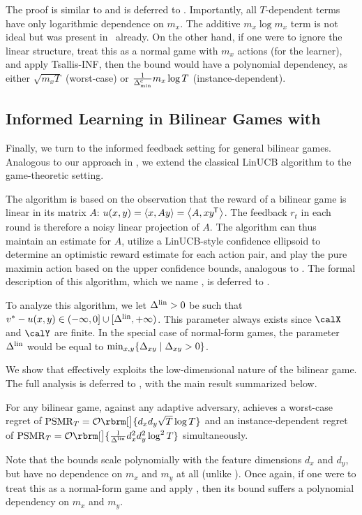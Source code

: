 The proof is similar to  and is deferred to .
Importantly, all $T$-dependent terms have only logarithmic dependence on $m_x$.
The additive $m_x\log m_x$ term is not ideal but was present in~\citet{ito2024adaptive} already.
On the other hand, if one were to ignore the linear structure, treat this as a normal game with $m_x$ actions (for the learner), and apply Tsallis-INF, then the bound would have a polynomial dependency, as either $\sqrt{m_x T}$ (worst-case) or $\frac{1}{\Delta^{\mathrm{c}}_{\mathrm{min}}}m_x\log T$ (instance-dependent).

%

\subsection{Informed Learning in Bilinear Games with \PureLinUCB{}}\label{h2:linucb}

Finally, we turn to the informed feedback setting for general bilinear games.
Analogous to our approach in , we extend the classical LinUCB algorithm \citep{abbasi-yadkori2011improved} to the game-theoretic setting.





The algorithm is based on the observation that the reward of a bilinear game is linear in its matrix $A$: $u(x,y)=\inner{x}{Ay}=\inner{A}{x y^\trans}$. The feedback $r_t$ in each round is therefore a noisy linear projection of $A$. 
The algorithm can thus maintain an estimate for $A$, utilize a LinUCB-style confidence ellipsoid to determine an optimistic reward estimate for each action pair, and play the pure maximin action based on the upper confidence bounds, analogous to \PureUCB.
The formal description of this algorithm, which we name \PureLinUCB{}, is deferred to .


To analyze this algorithm, we let $\Delta^{\mathrm{lin}}>0$ be such that $v^* - u(x,y)\in (-\infty,0]\cup [\Delta^{\mathrm{lin}}, +\infty)$. This parameter always exists since $\calX$ and $\calY$ are finite. In the special case of normal-form games, the parameter $\Delta^{\mathrm{lin}}$ would be equal to $\min_{x,y} \cbr{\Delta_{xy}\mid \Delta_{xy}>0}$. 

We show that \PureLinUCB{} effectively exploits the low-dimensional nature of the bilinear game.
The full analysis is deferred to , with
the main result summarized below.

\begin{theorem}\label{thm:purelinucb-informal}
    For any bilinear game, against any adaptive adversary, \PureLinUCB{} achieves a worst-case regret of $\psmr_T=\order\rbrm[\big]{d_x d_y \sqrt{T} \log T}$ and an instance-dependent regret of $\psmr_T=\order\rbrm[\big]{\frac{1}{\DeltaLin}d_x^2 d_y^2 \log^2 T}$ simultaneously.
\end{theorem}

Note that the bounds scale polynomially with the feature dimensions $d_x$ and $d_y$, but have no dependence on $m_x$ and $m_y$ at all (unlike ).
Once again, if one were to treat this as a normal-form game and apply \PureUCB{}, then its bound suffers a polynomial dependency on $m_x$ and $m_y$.
